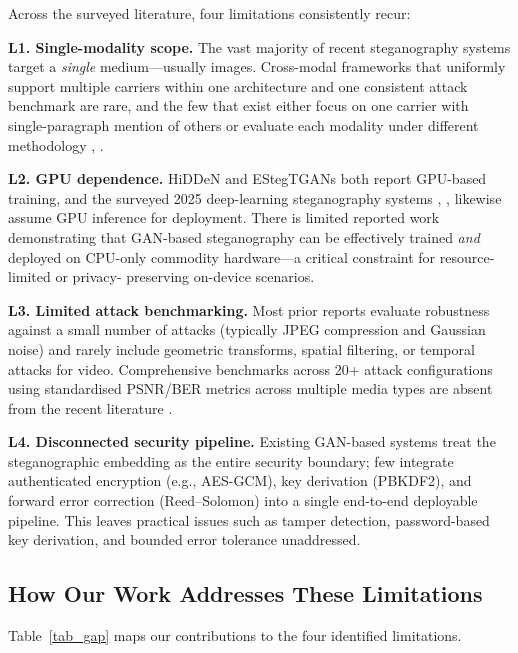 \documentclass[conference]{IEEEtran}
\begin{document}
Across the surveyed literature, four limitations consistently recur:

\textbf{L1. Single-modality scope.} The vast majority of recent
steganography systems target a \textit{single} medium—usually images.
Cross-modal frameworks that uniformly support multiple carriers
within one architecture and one consistent attack benchmark are rare,
and the few that exist either focus on one carrier with
single-paragraph mention of others or evaluate each modality under
different methodology \cite{b9}, \cite{b4}.

\textbf{L2. GPU dependence.} HiDDeN \cite{b8} and EStegTGANs
\cite{b7} both report GPU-based training, and the surveyed 2025
deep-learning steganography systems \cite{b2}, \cite{b5},
\cite{b3} likewise assume GPU inference for deployment. There is
limited reported work demonstrating that GAN-based steganography can
be effectively trained \textit{and} deployed on CPU-only commodity
hardware—a critical constraint for resource-limited or privacy-
preserving on-device scenarios.

\textbf{L3. Limited attack benchmarking.} Most prior reports evaluate
robustness against a small number of attacks (typically JPEG
compression and Gaussian noise) and rarely include geometric
transforms, spatial filtering, or temporal attacks for video.
Comprehensive benchmarks across 20+ attack configurations using
standardised PSNR/BER metrics across multiple media types are
absent from the recent literature \cite{b6}.

\textbf{L4. Disconnected security pipeline.} Existing GAN-based
systems treat the steganographic embedding as the entire security
boundary; few integrate authenticated encryption (e.g., AES-GCM),
key derivation (PBKDF2), and forward error correction
(Reed–Solomon) into a single end-to-end deployable pipeline. This
leaves practical issues such as tamper detection, password-based
key derivation, and bounded error tolerance unaddressed.

\subsection{How Our Work Addresses These Limitations}

Table~\ref{tab_gap} maps our contributions to the four identified
limitations.
\end{document}
